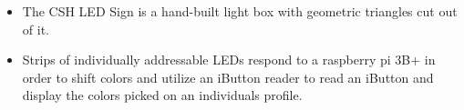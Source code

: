 \documentclass[10pt,a4paper]{altacv}
\begin{document}

\begin{itemize}
  \item The CSH LED Sign is a hand-built light box with geometric triangles cut out of it. 
  \item Strips of individually addressable LEDs respond to a raspberry pi 3B+ in order to shift colors and utilize an iButton reader to read an iButton and display the colors picked on an individuals profile.

\end{itemize}
















\end{document}
